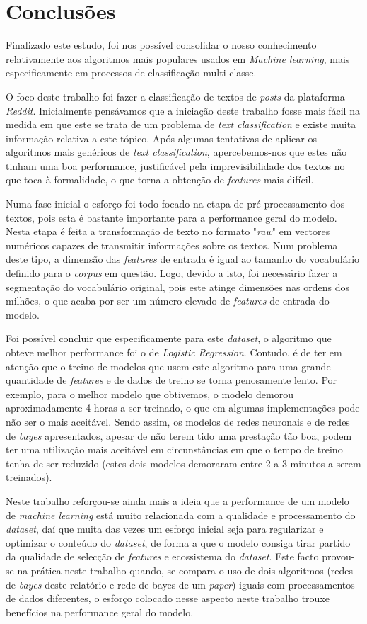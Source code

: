 \section{Conclusões}
Finalizado este estudo, foi nos possível consolidar o nosso conhecimento relativamente aos algoritmos mais populares usados em \textit{Machine learning}, mais especificamente em processos de classificação multi-classe. 

O foco deste trabalho foi fazer a classificação de textos de \textit{posts} da plataforma \textit{Reddit}. Inicialmente pensávamos que a iniciação deste trabalho fosse mais fácil na medida em que este se trata de um problema de \textit{text classification} e existe muita informação relativa a este tópico. Após algumas tentativas de aplicar os algoritmos mais genéricos de \textit{text classification}, apercebemos-nos que estes não tinham uma boa performance, justificável pela imprevisibilidade dos textos no que toca à formalidade, o que torna a obtenção de \textit{features} mais difícil.

Numa fase inicial o esforço foi todo focado na etapa de pré-processamento dos textos, pois esta é bastante importante para a performance geral do modelo. Nesta etapa é feita a transformação de texto no formato "\textit{raw}" em vectores numéricos capazes de transmitir informações sobre os textos. Num problema deste tipo, a dimensão das \textit{features} de entrada é igual ao tamanho do vocabulário definido para o \textit{corpus} em questão. Logo, devido a isto, foi necessário fazer a segmentação do vocabulário original, pois este atinge dimensões nas ordens dos milhões, o que acaba por ser um número elevado de \textit{features} de entrada do modelo.


Foi possível concluir que especificamente para este \textit{dataset}, o algoritmo que obteve melhor performance foi o de \textit{Logistic Regression}. Contudo, é de ter em atenção que o treino de modelos que usem este algoritmo para uma grande quantidade de \textit{features} e de dados de treino se torna penosamente lento. Por exemplo, para o melhor modelo que obtivemos, o modelo demorou aproximadamente 4 horas a ser treinado, o que em algumas implementações pode não ser o mais aceitável. Sendo assim, os modelos de redes neuronais e de redes de \textit{bayes} apresentados, apesar de não terem tido uma prestação tão boa, podem ter uma utilização mais aceitável em circunstâncias em que o tempo de treino tenha de ser reduzido (estes dois modelos demoraram entre 2 a 3 minutos a serem treinados).

Neste trabalho reforçou-se ainda mais a ideia que a performance de um modelo de \textit{machine learning} está muito relacionada com a qualidade e processamento do \textit{dataset}, daí que muita das vezes um esforço inicial seja para regularizar e optimizar o conteúdo do \textit{dataset}, de forma a que o modelo consiga tirar partido da qualidade de selecção de \textit{features} e ecossistema do \textit{dataset}. Este facto provou-se na prática neste trabalho quando, se compara o uso de dois algoritmos (redes de \textit{bayes} deste relatório e rede de bayes de um \textit{paper}) iguais com processamentos de dados diferentes, o esforço colocado nesse aspecto neste trabalho trouxe benefícios na performance geral do modelo.
